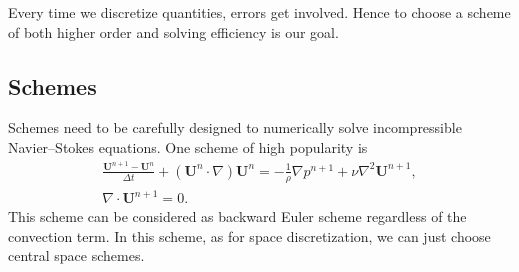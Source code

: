 \documentclass[english, nochinese]{pkupaper}
\begin{document}
Every time we discretize quantities, errors get involved. Hence to choose a scheme of both higher order and solving efficiency is our goal.

\subsection{Schemes}\label{SSec:Schemes}



Schemes need to be carefully designed to numerically solve incompressible Navier--Stokes equations. One scheme of high popularity is
\begin{equation}
\begin{gathered}
\frac{\mathbf{U}^{n+1} - \mathbf{U}^n}{\Delta t} + (\mathbf{U}^n\cdot\nabla)\mathbf{U}^n = - \frac{1}{\rho} \nabla p^{n+1} + \nu \nabla^2 \mathbf{U}^{n+1}, \\
\nabla\cdot \mathbf{U}^{n+1} = 0.
\end{gathered}
\end{equation}
This scheme can be considered as backward Euler scheme regardless of the convection term. In this scheme, as for space discretization, we can just choose central space schemes.


\end{document}
